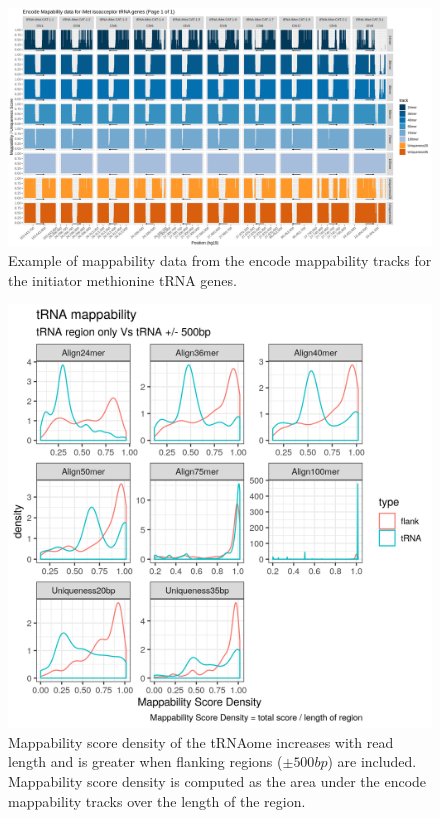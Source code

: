 \documentclass[]{book}
\begin{document}
\begin{figure}

{\centering \includegraphics[width=1\linewidth]{./figs/mappability-iMet1} 

}

\caption{Example of mappability data from the encode mappability tracks \citep{Derrien2012} for the initiator methionine tRNA genes.}\label{fig:mappabilityiMet1}
\end{figure}



\begin{figure}

{\centering \includegraphics[width=1\linewidth]{./figs/mappabilityScoreDensity_tRNAVsFlank500} 

}

\caption{Mappability score density of the tRNAome increases with read length and is greater when flanking regions (\(\pm500bp\)) are included. Mappability score density is computed as the area under the encode mappability tracks \citep{Derrien2012} over the length of the region.}\label{fig:mappabilityScoreDensity}
\end{figure}
\end{document}
